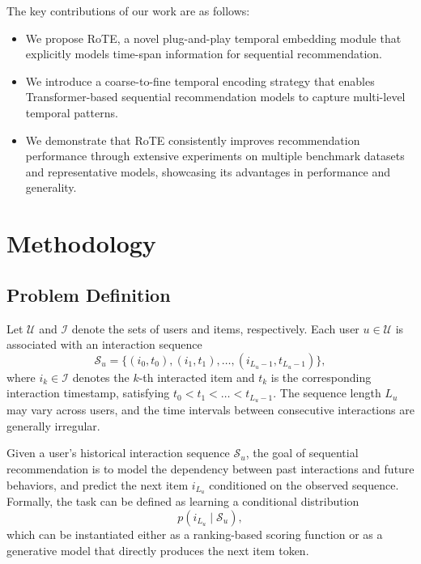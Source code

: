 \documentclass[sigconf,natbib=true]{acmart}
\begin{document}
The key contributions of our work are as follows:

\begin{itemize}[left=0pt]

    \item We propose RoTE, a novel plug-and-play temporal embedding module that explicitly models time-span information for sequential recommendation.

    \item We introduce a coarse-to-fine temporal encoding strategy that enables Transformer-based sequential recommendation models to capture multi-level temporal patterns.

    \item We demonstrate that RoTE consistently improves recommendation performance through extensive experiments on multiple benchmark datasets and representative models, showcasing its advantages in performance and generality.
    
\end{itemize}


\section{Methodology}

\subsection{Problem Definition}

Let $\mathcal{U}$ and $\mathcal{I}$ denote the sets of users and items, respectively.
Each user $u \in \mathcal{U}$ is associated with an interaction sequence
\begin{equation}
\mathcal{S}_u = \{(i_0, t_0), (i_1, t_1), \dots, (i_{L_u-1}, t_{L_u-1})\},
\end{equation}
where $i_k \in \mathcal{I}$ denotes the $k$-th interacted item and $t_k$ is the corresponding interaction timestamp, satisfying $t_0 < t_1 < \dots < t_{L_u-1}$.
The sequence length $L_u$ may vary across users, and the time intervals between consecutive interactions are generally irregular.

Given a user’s historical interaction sequence $\mathcal{S}_u$, the goal of sequential recommendation is to model the dependency between past interactions and future behaviors, and predict the next item $i_{L_u}$ conditioned on the observed sequence.
Formally, the task can be defined as learning a conditional distribution
\begin{equation}
p(i_{L_u} \mid \mathcal{S}_u),
\end{equation}
which can be instantiated either as a ranking-based scoring function or as a generative model that directly produces the next item token.
\end{document}
